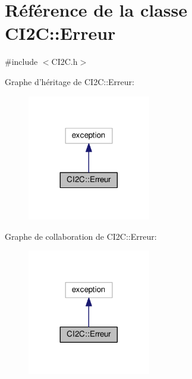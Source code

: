 \hypertarget{class_c_i2_c_1_1_erreur}{\section{Référence de la classe C\+I2\+C\+:\+:Erreur}
\label{class_c_i2_c_1_1_erreur}
}


{\ttfamily \#include $<$C\+I2\+C.\+h$>$}



Graphe d'héritage de C\+I2\+C\+:\+:Erreur\+:
\nopagebreak
\begin{figure}[H]
\begin{center}
\leavevmode
\includegraphics[width=152pt]{class_c_i2_c_1_1_erreur__inherit__graph}
\end{center}
\end{figure}


Graphe de collaboration de C\+I2\+C\+:\+:Erreur\+:
\nopagebreak
\begin{figure}[H]
\begin{center}
\leavevmode
\includegraphics[width=152pt]{class_c_i2_c_1_1_erreur__coll__graph}
\end{center}
\end{figure}
